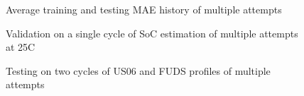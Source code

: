 \begin{figure*}[htbp]
    \centering
    \begin{subfigure}[b]{0.325\textwidth}
        \centering
        
        \caption{Average training and testing MAE history of multiple attempts}
    \end{subfigure}
    \hfill
    \begin{subfigure}[b]{0.325\textwidth}
        \centering
        
        \caption{Validation on a single cycle of SoC estimation of multiple attempts at 25\textdegree{}C}
    \end{subfigure}
    \hfill
    \begin{subfigure}[b]{0.325\textwidth}
        \centering
        
        \caption{Testing on two cycles of US06 and FUDS profiles of multiple attempts}
        \label{subfig:Model-1res-DSTvsFUDS}
    \end{subfigure}
    \begin{subfigure}[b]{0.325\textwidth}

\end{subfigure}
\end{figure*}

